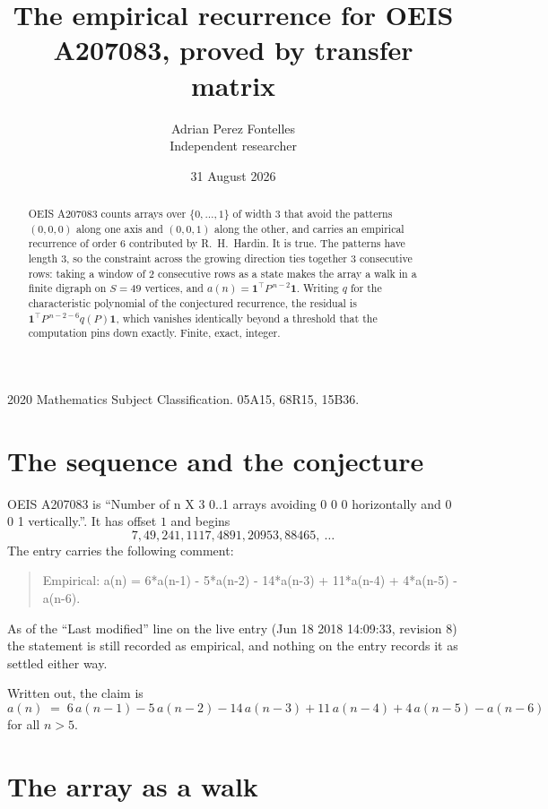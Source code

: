 \documentclass[11pt,a4paper]{article}
\title{The empirical recurrence for OEIS A207083, proved by transfer matrix}
\author{Adrian Perez Fontelles\\ \small Independent researcher}
\date{31 August 2026}
\theoremstyle{plain}
\theoremstyle{definition}
\begin{document}
\maketitle

\begin{abstract}
OEIS A207083 counts arrays over $\{0,\dots,1\}$ of width $3$ that avoid the patterns
$(0,0,0)$ along one axis and $(0,0,1)$ along the other, and carries an empirical recurrence of
order $6$ contributed by R.~H.~Hardin. It is true. The patterns have length $3$, so
the constraint across the growing direction ties together $3$ consecutive rows: taking a
window of $2$ consecutive rows as a state makes the array a walk in a finite digraph
on $S=49$ vertices, and $a(n)=\mathbf{1}^{\!\top}P^{\,n-2}\mathbf{1}$. Writing $q$
for the characteristic polynomial of the conjectured recurrence, the residual is
$\mathbf{1}^{\!\top}P^{\,n-2-6}q(P)\mathbf{1}$, which vanishes identically
beyond a threshold that the computation pins down exactly. Finite, exact, integer.
\end{abstract}

\noindent\small 2020 Mathematics Subject Classification. 05A15, 68R15, 15B36.\normalsize

\section{The sequence and the conjecture}

OEIS A207083 is ``Number of n X 3 0..1 arrays avoiding 0 0 0 horizontally and 0 0 1 vertically.''. It has offset
$1$ and begins
\[
7, 49, 241, 1117, 4891, 20953, 88465,\ \dots
\]
The entry carries the following comment:
\begin{quote}\small
Empirical: a(n) = 6*a(n-1) - 5*a(n-2) - 14*a(n-3) + 11*a(n-4) + 4*a(n-5) - a(n-6).
\end{quote}
As of the ``Last modified'' line on the live entry (Jun 18 2018 14:09:33, revision
8) the statement is still recorded as empirical, and nothing on the entry
records it as settled either way.

Written out, the claim is
\begin{equation}\label{eq:conj}
a(n)\;=\;6\,a(n-1) - 5\,a(n-2) - 14\,a(n-3) + 11\,a(n-4) + 4\,a(n-5) - a(n-6)
\end{equation}
for all $n>5$. 

\section{The array as a walk}
\end{document}
